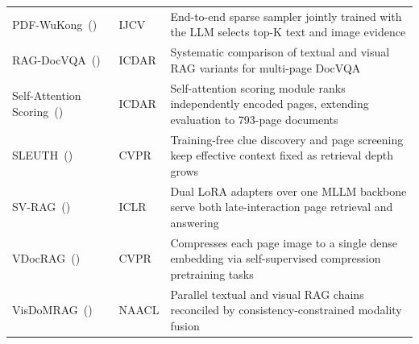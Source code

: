 \begin{table}[p]
\begin{tabularx}{\textwidth}{@{}l l >{\raggedright\arraybackslash}X@{}}
  {PDF-WuKong}~(\citeyear{xie2026wukong}) & IJCV & End-to-end sparse sampler jointly trained with the LLM selects top-K text and image evidence \\
  {RAG-DocVQA}~(\citeyear{lopez2025enhancing}) & ICDAR & Systematic comparison of textual and visual RAG variants for multi-page DocVQA \\
  {Self-Attention Scoring}~(\citeyear{kang2024multi}) & ICDAR & Self-attention scoring module ranks independently encoded pages, extending evaluation to 793-page documents \\
  {SLEUTH}~(\citeyear{liu2026sleuth}) & CVPR & Training-free clue discovery and page screening keep effective context fixed as retrieval depth grows \\
  {SV-RAG}~(\citeyear{chen2025svrag}) & ICLR & Dual LoRA adapters over one MLLM backbone serve both late-interaction page retrieval and answering \\
  {VDocRAG}~(\citeyear{tanaka2025vdocrag}) & CVPR & Compresses each page image to a single dense embedding via self-supervised compression pretraining tasks \\
  {VisDoMRAG}~(\citeyear{suri2025visdom}) & NAACL & Parallel textual and visual RAG chains reconciled by consistency-constrained modality fusion \\

\midrule[0.4pt]


\end{tabularx}
\end{table}
